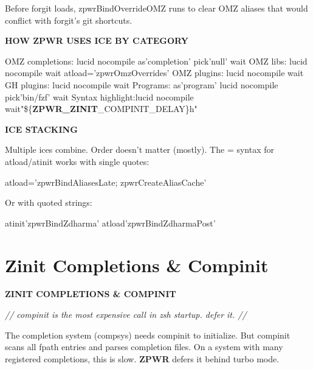 \documentclass[11pt,a4paper,twoside]{book}
\begin{document}
Before forgit loads, zpwrBindOverrideOMZ runs to clear OMZ aliases that would conflict with forgit's git shortcuts.


\vspace{12pt}
{\bfseries\color{neonyellow} HOW \textbf{ZPWR} USES ICE BY CATEGORY}\vspace{4pt}

OMZ completions: lucid nocompile as'completion' pick'null' wait OMZ libs:        lucid nocompile wait atload='zpwrOmzOverrides' OMZ plugins:     lucid nocompile wait GH plugins:      lucid nocompile wait Programs:        as'program' lucid nocompile pick'bin/fzf' wait Syntax highlight:lucid nocompile wait"\$\{\textbf{ZPWR\_ZINIT}\_COMPINIT\_DELAY\}h"


\vspace{12pt}
{\bfseries\color{neonyellow} ICE STACKING}\vspace{4pt}

Multiple ices combine. Order doesn't matter (mostly). The = syntax for atload/atinit works with single quotes:

\begin{codebox}
\color{neongreen}atload='zpwrBindAliasesLate; zpwrCreateAliasCache'\\
\end{codebox}

Or with quoted strings:

\begin{codebox}
\color{neongreen}atinit'zpwrBindZdharma' atload'zpwrBindZdharmaPost'\\
\end{codebox}


\vspace{16pt}

\section{Zinit Completions \& Compinit}


\vspace{10pt}
{\large\bfseries\color{neoncyan} ZINIT COMPLETIONS \& COMPINIT}\vspace{6pt}

{\small\itshape\color{dimtext} // compinit is the most expensive call in zsh startup. defer it. //}

The completion system (compsys) needs compinit to initialize. But compinit scans all fpath entries and parses completion files. On a system with many registered completions, this is slow. \textbf{ZPWR} defers it behind turbo mode.
\end{document}
